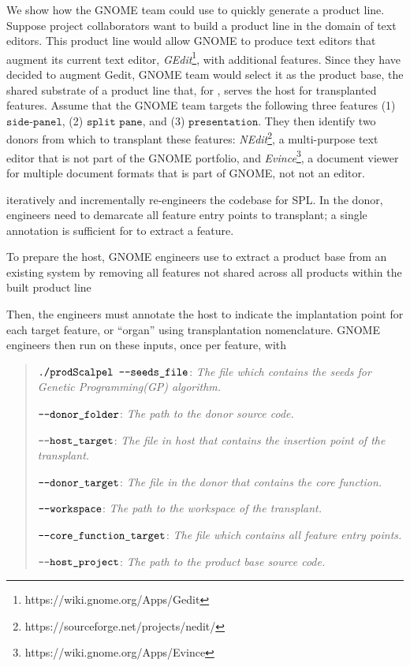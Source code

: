 We show how the GNOME team could use \prodscalpel to quickly generate a product line. Suppose project collaborators want to build a product line in the domain of text editors. This product line would allow GNOME to produce text editors that augment its current text editor, \emph{GEdit}\footnote{https://wiki.gnome.org/Apps/Gedit}, with additional features. Since they have decided to augment Gedit, GNOME team would select it as the product base, the shared substrate of a product line that, for \FOUNDRY, serves the host for transplanted features.  Assume that the GNOME team targets the following three features (1) $\texttt{side-panel}$, (2) $\texttt{split pane}$, and (3) $\texttt{presentation}$. They then identify two donors from which to transplant these features:  \emph{NEdit}\footnote{https://sourceforge.net/projects/nedit/}, a multi-purpose text editor that is not part of the GNOME portfolio, and \emph{Evince}\footnote{https://wiki.gnome.org/Apps/Evince}, a document viewer for multiple document formats that is part of GNOME, not not an editor. 
 
\prodscalpel iteratively and incrementally re-engineers the codebase for SPL.  In the donor, engineers need to demarcate all feature entry points to transplant; a single annotation is sufficient for \prodscalpel to extract a feature. 

To prepare the host, GNOME engineers use \prodscalpel to extract a product base from an existing system by removing all features not shared across all products within the built product line
 
Then, the engineers must annotate the host to indicate the implantation point for each target feature, or “organ” using transplantation nomenclature. GNOME engineers then run \prodscalpel on these inputs, once per feature, with 

\begin{quote}
    $\texttt{./prodScalpel \textemdash \textemdash seeds\_file}$: \textit{ The file which contains the seeds for Genetic Programming(GP) algorithm.} 

    $\texttt{\textemdash \textemdash donor\_folder}$: \textit{The path to the donor source code.} 
    
    $\texttt{\textemdash \textemdash host\_target}$: \textit{The file in host that contains the insertion point of the transplant.}
    
    $\texttt{\textemdash \textemdash donor\_target}$: \textit{The file in the donor that contains the core function.}
    
    $\texttt{\textemdash \textemdash workspace}$: \textit{The path to the workspace of the transplant.}
    
    $\texttt{\textemdash \textemdash core\_function\_target}$: \textit{The file which contains all feature entry points.}
    
     $\texttt{\textemdash \textemdash  host\_project}$: \textit{The path to the product base source code.}
     
   \end{quote} 

